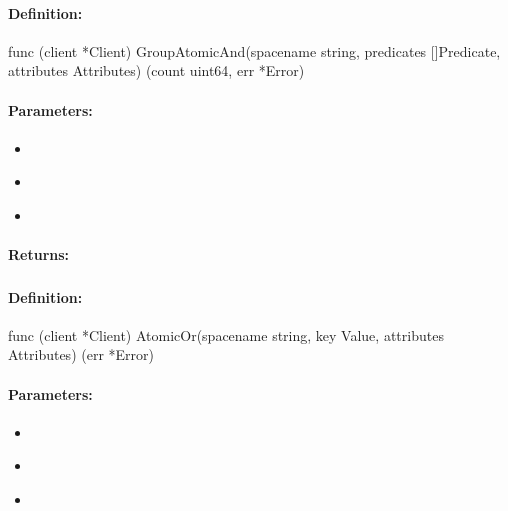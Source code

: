 \paragraph{Definition:}
\begin{gocode}
func (client *Client) GroupAtomicAnd(spacename string, predicates []Predicate, attributes Attributes) (count uint64, err *Error)
\end{gocode}

\paragraph{Parameters:}
\begin{itemize}[noitemsep]
\item {}\\

\item {}\\

\item {}\\

\end{itemize}

\paragraph{Returns:}


\pagebreak
\subsubsection{}
\label{api:Go:AtomicOr}


\paragraph{Definition:}
\begin{gocode}
func (client *Client) AtomicOr(spacename string, key Value, attributes Attributes) (err *Error)
\end{gocode}

\paragraph{Parameters:}
\begin{itemize}[noitemsep]
\item {}\\

\item {}\\

\item {}\\

\end{itemize}

